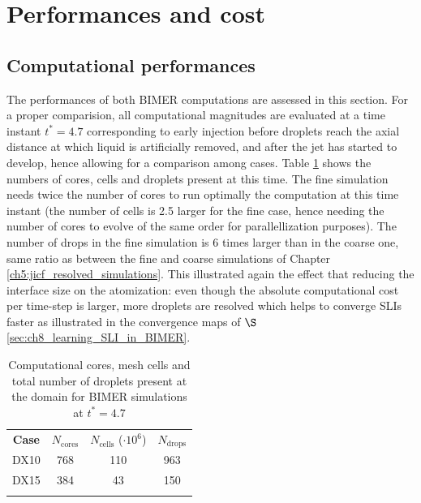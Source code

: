 \clearpage

\section{Performances and cost}
\label{sec:ch8_BIMER_performances_cost}


\subsection{Computational performances}

The performances of both BIMER computations are assessed in this section. For a proper comparision, all computational magnitudes are evaluated at a time instant $t^* = 4.7$ corresponding to early injection before droplets reach the axial distance at which liquid is artificially removed, and after the jet has started to develop, hence allowing for a comparison among cases. Table \ref{tab:BIMER_Ncores_Ncells_Ndrops} shows the numbers of cores, cells and droplets present at this time. The fine simulation needs twice the number of cores to run optimally the computation at this time instant (the number of cells is 2.5 larger for the fine case, hence needing the number of cores to evolve of the same order for parallellization purposes). The number of drops in the fine simulation is 6 times larger than in the coarse one, same ratio as between the fine and coarse simulations of Chapter \ref{ch5:jicf_resolved_simulations}. This illustrated again the effect that reducing the interface size on the atomization: even though the absolute computational cost per time-step is larger, more droplets are resolved which helps to converge SLIs faster as illustrated in the convergence maps of $\S$\ref{sec:ch8_learning_SLI_in_BIMER}. 



\begin{table}[!h]
\centering
\caption{Computational cores, mesh cells and total number of droplets present at the domain for BIMER simulations at $t^* = 4.7$}
\begin{tabular}{cccc}
\thickhline
\textbf{Case} &  $N_\mathrm{cores}$ & $N_\mathrm{cells}$ ($\cdot 10^6$) & $N_\mathrm{drops}$\\
\thickhline 
DX10 & 768  & 110 & 963 \\ %
DX15 & 384 & 43 & 150  \\ %
\thickhline
\end{tabular}
\label{tab:BIMER_Ncores_Ncells_Ndrops}
\end{table}

